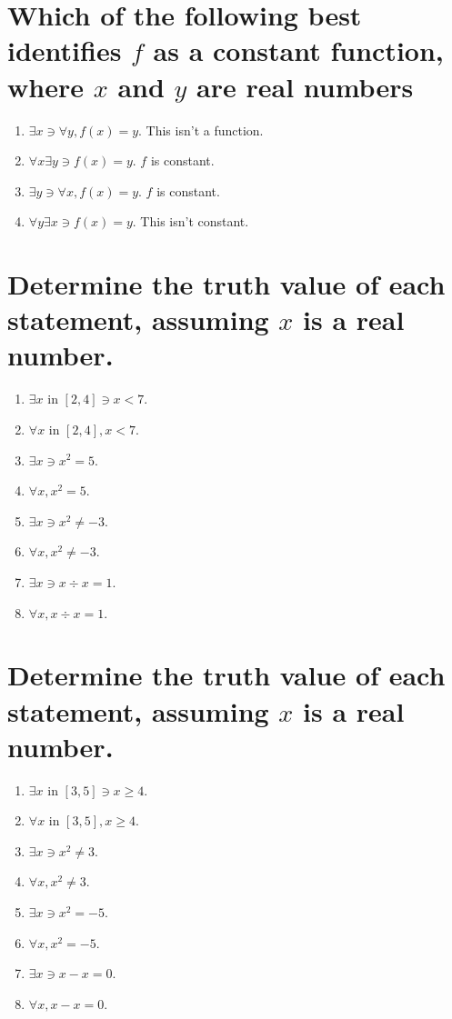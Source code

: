 \documentclass[11pt]{article} %
\begin{document}
\section{Which of the following best identifies $f$ as a constant function, where $x$ and $y$ are real numbers}
\begin{enumerate}
\item $\exists x \ni \forall y, f(x)=y$.
\subitem This isn't a function.
\item $\forall x \exists y \ni f(x) = y$.
\subitem $f$ is constant.
\item $\exists y \ni \forall x, f(x) = y$.
\subitem $f$ is constant.
\item $\forall y \exists x \ni f(x) = y$.
\subitem This isn't constant.
\end{enumerate}

\section{Determine the truth value of each statement, assuming $x$ is a real number.}
\begin{enumerate}
\item $\exists x$ in $\left[ 2,4 \right] \ni x<7$.
\item $\forall x$ in $\left[ 2,4 \right], x<7$.
\item $\exists x \ni x^2=5$.
\item $\forall x, x^2=5$.
\item $\exists x \ni x^2 \neq -3$.
\item $\forall x, x^2 \neq -3$.
\item $\exists x \ni x \div x = 1$.
\item $\forall x, x \div x = 1$.
\end{enumerate}

\section{Determine the truth value of each statement, assuming $x$ is a real number.}
\begin{enumerate}
\item $\exists x$ in $\left[ 3,5 \right]\ni x\geq4$.
\item $\forall x$ in $\left[ 3,5 \right], x\geq4$.
\item $\exists x \ni x^2 \neq 3$.
\item $\forall x, x^2 \neq 3$.
\item $\exists x \ni x^2 = -5$.
\item $\forall x, x^2 = -5$.
\item $\exists x \ni x-x=0$.
\item $\forall x, x-x=0$.
\end{enumerate}
\end{document}
